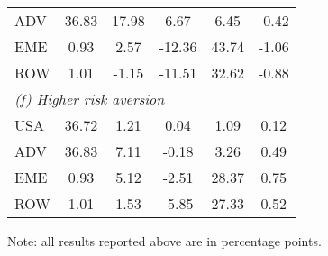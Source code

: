 \begin{table}[p]
\begin{center}
\begin{threeparttable}
\begin{tabular}{l c c c c c}
ADV& 36.83&17.98&6.67&6.45&-0.42\\
EME& 0.93&2.57&-12.36&43.74&-1.06\\
ROW& 1.01&-1.15&-11.51&32.62&-0.88\\
\midrule
\multicolumn{6}{l}{\textit{(f) Higher risk aversion}}\\
USA& 36.72&1.21&0.04&1.09&0.12\\
ADV& 36.83&7.11&-0.18&3.26&0.49\\
EME& 0.93&5.12&-2.51&28.37&0.75\\
ROW& 1.01&1.53&-5.85&27.33&0.52\\
\bottomrule
\end{tabular}
\normalsize
\begin{tablenotes}
\small
\item Note: all results reported above are in percentage points.
\normalsize
\end{tablenotes}
\end{threeparttable}
\end{center}
\end{table}
